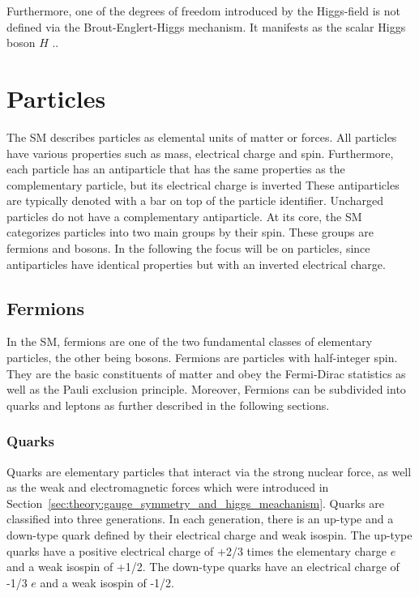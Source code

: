 \documentclass[bachelor,ngerman,english]{GAUBM}
\begin{document}
Furthermore, one of the degrees of freedom introduced by the Higgs-field is not defined via the Brout-Englert-Higgs mechanism. It manifests as the scalar Higgs boson $H$ \cite{theory:higgs_mechanism_01}..


\section{Particles}
\label{sec:theory:particles}
The SM describes particles as elemental units of matter or forces. All particles have various properties such as mass, electrical charge and spin. Furthermore, each particle has an antiparticle that has the same properties as the complementary particle, but its electrical charge is inverted These antiparticles are typically denoted with a bar on top of the particle identifier. Uncharged particles do not have a complementary antiparticle. At its core, the SM categorizes particles into two main groups by their spin. These groups are fermions and bosons. In the following the focus will be on particles, since antiparticles have identical properties but with an inverted electrical charge. 


\subsection*{Fermions}
In the SM, fermions are one of the two fundamental classes of elementary particles, the other being bosons. Fermions are particles with half-integer spin. They are the basic constituents of matter and obey the Fermi-Dirac statistics as well as the Pauli exclusion principle. Moreover, Fermions can be subdivided into quarks and leptons as further described in the following sections. 

\subsubsection*{Quarks}
Quarks are elementary particles that interact via the strong nuclear force, as well as the weak and electromagnetic forces which were introduced in Section~\ref{sec:theory:gauge_symmetry_and_higgs_meachanism}. Quarks are classified into three generations. In each generation, there is an up-type and a down-type quark defined by their electrical charge and weak isospin. The up-type quarks have a positive electrical charge of +2/3 times the elementary charge $e$ and a weak isospin of +1/2. The down-type quarks have an electrical charge of -1/3 $e$ and a weak isospin of -1/2. 
\end{document}

